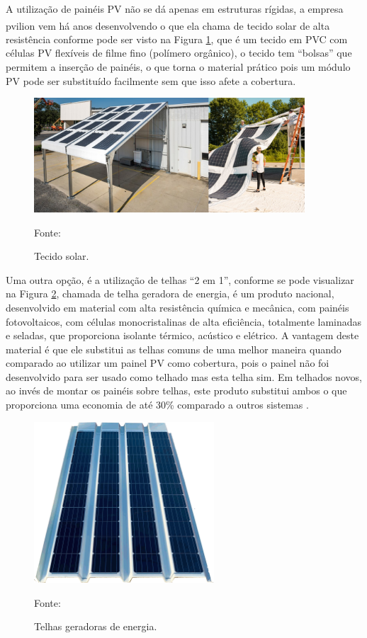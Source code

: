 A utilização de painéis PV não se dá apenas em estruturas rígidas, a empresa pvilion\textsuperscript{\textregistered} vem há anos desenvolvendo o que ela chama de tecido solar de alta resistência conforme pode ser visto na Figura \ref{fig:tecido_solar}, que é um tecido em PVC com células PV flexíveis de filme fino (polímero orgânico), o tecido tem ``bolsas'' que permitem a inserção de painéis, o que torna o material prático pois um módulo PV pode ser substituído facilmente sem que isso afete a cobertura.

\begin{figure}[H]
    \centering
    \includegraphics[width=0.9\textwidth]{./Figuras/tecido_solar.png}
    \caption{Tecido solar.}{Fonte: \cite{pvilion}}
   \label{fig:tecido_solar}
\end{figure}

Uma outra opção, é a utilização de telhas ``2 em 1'', conforme se pode visualizar na Figura \ref{fig:telha_pv}, chamada de telha geradora de energia, é um produto nacional, desenvolvido em material com alta resistência química e mecânica, com painéis fotovoltaicos, com células monocristalinas de alta eficiência, totalmente laminadas e seladas, que proporciona isolante térmico, acústico e elétrico. A vantagem deste material é que ele substitui as telhas comuns de uma melhor maneira quando comparado ao utilizar um painel PV como cobertura, pois o painel não foi desenvolvido para ser usado como telhado mas esta telha sim. Em telhados novos, ao invés de montar os painéis sobre telhas, este produto substitui ambos o que proporciona uma economia de até 30\% comparado a outros sistemas \cite{ecotelhasolar}.

\begin{figure}[H]
    \centering
    \includegraphics[width=0.6\textwidth]{./Figuras/telha_pv.png}
    \caption{Telhas geradoras de energia.}{Fonte: \cite{ecotelhasolar}}
   \label{fig:telha_pv}
\end{figure}

